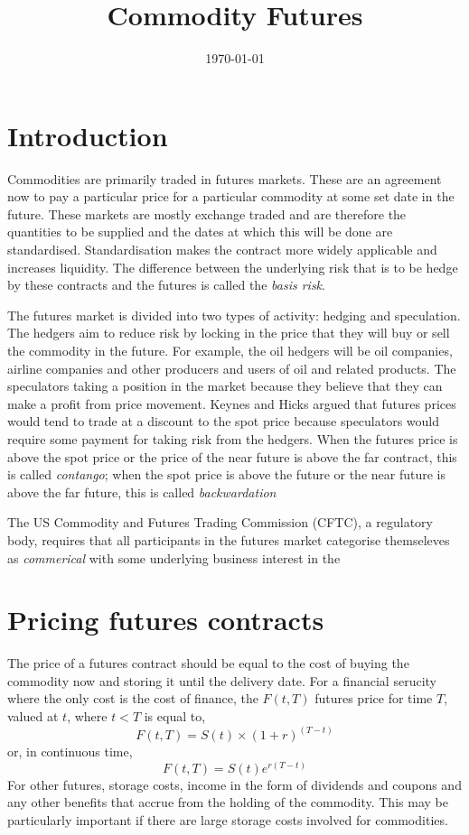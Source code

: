 \documentclass[12pt, a4paper, oneside]{article}\usepackage{graphicx, color}
\begin{document}
\title{Commodity Futures}
\date{\today}
\maketitle
\section*{Introduction}
Commodities are primarily traded in futures markets.  These are an agreement now to pay a particular price for a particular commodity at some set date in the future. These markets are mostly exchange traded and are therefore the quantities to be supplied and the dates at which this will be done are standardised.  Standardisation makes the contract more widely applicable and increases liquidity.  The difference between the underlying risk that is to be hedge by these contracts and the futures is called the \emph{basis risk}.  

The futures market is divided into two types of activity:  hedging and speculation.  The hedgers aim to reduce risk by locking in the price that they will buy or sell the commodity in the future.  For example, the oil hedgers will be oil companies, airline companies and other producers and users of oil and related products. The speculators taking a position in the market because they believe that they can make a profit from price movement.  Keynes and Hicks argued that futures prices would tend to trade at a discount to the spot price because speculators would require some payment for taking risk from the hedgers. When the futures price is above the spot price or the price of the near future is above the far contract, this is called \emph{contango}; when the spot price is above the future or the near future is above the far future, this is called \emph{backwardation}

The US Commodity and Futures Trading Commission (CFTC), a regulatory body, requires that all participants in the futures market categorise themseleves as \emph{commerical} with some underlying business interest in the 

\section*{Pricing futures contracts}
The price of a futures contract should be equal to the cost of buying the commodity now and storing it until the delivery date.  For a financial serucity where the only cost is the cost of finance, the $F(t, T)$ futures price for time $T$, valued at $t$, where $t<T$ is equal to, 
\begin{equation*}
F(t, T) = S(t) \times (1 +r)^{(T-t)}
\end{equation*}
or, in continuous time, 
\begin{equation*}
F(t, T) = S(t)e^{r(T-t)}
\end{equation*}
For other futures, storage costs, income in the form of dividends and coupons and any other benefits that accrue from the holding of the commodity. This may be particularly important if there are large storage costs involved for commodities.
\end{document}
